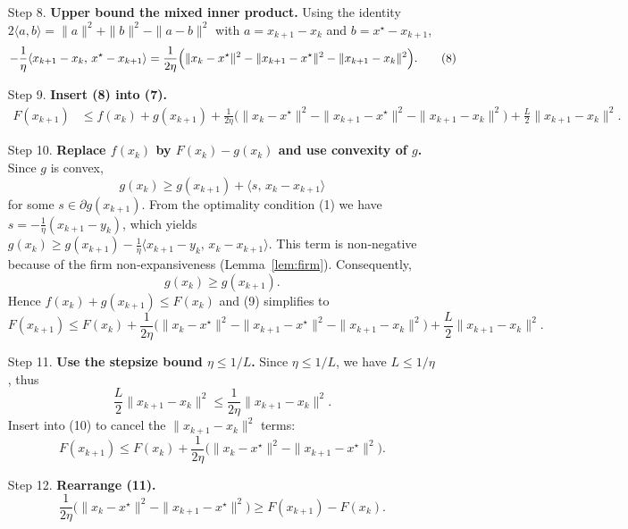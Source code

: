 \documentclass{article}
\begin{document}
\begin{enumerate}
\item[Step 8.] \textbf{Upper bound the mixed inner product.}  
Using the identity $2\langle a,b\rangle = \|a\|^{2}+\|b\|^{2}-\|a-b\|^{2}$ with
$a=x_{k+1}-x_{k}$ and $b=x^{\star}-x_{k+1}$,
\[
-\frac{1}{\eta}\langle x_{k+1}-x_{k},\,x^{\star}-x_{k+1}\rangle
= \frac{1}{2\eta}\Bigl(\|x_{k}-x^{\star}\|^{2}
                     -\|x_{k+1}-x^{\star}\|^{2}
                     -\|x_{k+1}-x_{k}\|^{2}\Bigr). \tag{8}
\]

\item[Step 9.] \textbf{Insert (8) into (7).}  
\[
\begin{aligned}
F(x_{k+1}) &\le f(x_{k})+g(x_{k+1})
            +\frac{1}{2\eta}\bigl(\|x_{k}-x^{\star}\|^{2}
                                 -\|x_{k+1}-x^{\star}\|^{2}
                                 -\|x_{k+1}-x_{k}\|^{2}\bigr)
            +\frac{L}{2}\|x_{k+1}-x_{k}\|^{2}.
\end{aligned}
\tag{9}
\]

\item[Step 10.] \textbf{Replace $f(x_{k})$ by $F(x_{k})-g(x_{k})$ and use convexity of $g$.}  
Since $g$ is convex,
\[
g(x_{k})\ge g(x_{k+1})+\langle s,\,x_{k}-x_{k+1}\rangle
\]
for some $s\in\partial g(x_{k+1})$. From the optimality condition (1) we have $s=-\frac{1}{\eta}(x_{k+1}-y_{k})$, which yields $g(x_{k})\ge g(x_{k+1})-\frac{1}{\eta}\langle x_{k+1}-y_{k},\,x_{k}-x_{k+1}\rangle$. This term is non‑negative because of the firm non‑expansiveness (Lemma~\ref{lem:firm}). Consequently,
\[
g(x_{k})\ge g(x_{k+1}) .
\]
Hence $f(x_{k})+g(x_{k+1})\le F(x_{k})$ and (9) simplifies to
\[
F(x_{k+1})\le F(x_{k})
            +\frac{1}{2\eta}\bigl(\|x_{k}-x^{\star}\|^{2}
                                 -\|x_{k+1}-x^{\star}\|^{2}
                                 -\|x_{k+1}-x_{k}\|^{2}\bigr)
            +\frac{L}{2}\|x_{k+1}-x_{k}\|^{2}. \tag{10}
\]

\item[Step 11.] \textbf{Use the stepsize bound $\eta\le 1/L$.}  
Since $\eta\le 1/L$, we have $L\le 1/\eta$, thus
\[
\frac{L}{2}\|x_{k+1}-x_{k}\|^{2}
\le \frac{1}{2\eta}\|x_{k+1}-x_{k}\|^{2}.
\]
Insert into (10) to cancel the $\|x_{k+1}-x_{k}\|^{2}$ terms:
\[
F(x_{k+1})\le F(x_{k})
            +\frac{1}{2\eta}\bigl(\|x_{k}-x^{\star}\|^{2}
                                 -\|x_{k+1}-x^{\star}\|^{2}\bigr). \tag{11}
\]

\item[Step 12.] \textbf{Rearrange (11).}  
\[
\frac{1}{2\eta}\bigl(\|x_{k}-x^{\star}\|^{2}
                     -\|x_{k+1}-x^{\star}\|^{2}\bigr)
\ge F(x_{k+1})-F(x_{k}). \tag{12}
\]


\end{enumerate}
\end{document}
